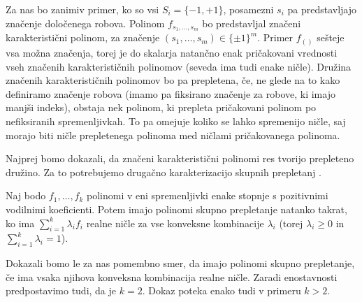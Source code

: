Za nas bo zanimiv primer, ko so vsi \(S_i=\{-1, +1\}\), posamezni \(s_i\) pa predstavljajo značenje določenega robova. Polinom \(f_{s_1, \ldots, s_m}\) bo predstavljal značeni karakteristični polinom, za značenje \((s_1,\ldots, s_m) \in \{\pm 1\}^m\). Primer \(f_{()}\) sešteje vsa možna značenja, torej je do skalarja natančno enak pričakovani vrednosti vseh značenih karakterističnih polinomov (seveda ima tudi enake ničle). Družina značenih karakterističnih polinomov bo pa prepletena, če, ne glede na to kako definiramo značenje robova (imamo pa fiksirano značenje za robove, ki imajo manjši indeks), obstaja nek polinom, ki prepleta pričakovani polinom po nefiksiranih spremenljivkah. To pa omejuje koliko se lahko spremenijo ničle, saj morajo biti ničle prepletenega polinoma med ničlami pričakovanega polinoma.

Najprej bomo dokazali, da značeni karakteristični polinomi res tvorijo prepleteno družino. Za to potrebujemo drugačno karakterizacijo skupnih prepletanj \cite{DEDIEU1992269}.
\begin{izrek}\label{konveksne-kombinacije-prepletenih}
    Naj bodo \(f_1, \ldots, f_k\) polinomi v eni spremenljivki enake stopnje s pozitivnimi vodilnimi koeficienti. Potem imajo polinomi skupno prepletanje natanko takrat, ko ima \(\sum_{i=1}^k \lambda_i f_i\) realne ničle za vse konveksne kombinacije \(\lambda_i\) (torej \(\lambda_i\geq 0\) in \(\sum_{i=1}^k \lambda_i=1\)).
\end{izrek}
Dokazali bomo le za nas pomembno smer, da imajo polinomi skupno prepletanje, če ima vsaka njihova konveksna kombinacija realne ničle. Zaradi enostavnosti predpostavimo tudi, da je \(k=2\). Dokaz poteka enako tudi v primeru \(k>2\).
